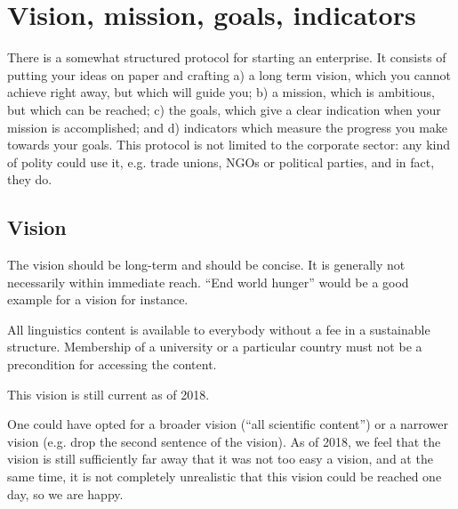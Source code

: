 \documentclass[nonflat,smallfont
]{langsci/langscibook}
\newcommand{\background}[1]{ 
  \vspace{5mm}
  \renewcommand{\tblslinecolour}{lsDarkBlue}
  \tblssy[red]{explore2}{Background}{\vspace*{-5mm}#1}
}
\newcommand{\langscisolution}[1]{
  \renewcommand{\tblslinecolour}{lsLightBlue}
  \tblssy{langsci}{LangSci solution}{\vspace*{-5mm}#1}
}
\newcommand{\evaluation}[1]{
  \renewcommand{\tblslinecolour}{lsLightOrange}
  \tblssy{receipt}{Evaluation}{\vspace*{-5mm}#1}
}
\newcommand{\othersolutions}[1]{
  \renewcommand{\tblslinecolour}{lsDarkGreenOne}
  \tblssy{more}{Other solutions}{\vspace*{-5mm}#1}
}
\renewcommand{\tblssy}[4][black!12]{%
  \renewcommand{\langscisymbol}{#2}\renewcommand{\tblsboxcolor}{#1}
  \begin{mdframed}[style=yellowexercise,frametitle={#3}]
    #4
  \end{mdframed}
}
\begin{document}
\section{Vision, mission, goals, indicators}
There is a somewhat structured protocol for starting an enterprise. It consists of putting your ideas on paper and crafting a) a long term vision, which you cannot achieve right away, but which will guide you;
b) a mission, which is ambitious, but which can be reached; 
c) the goals, which give a clear indication when your mission is accomplished; and
d) indicators which measure the progress you make towards your goals. 
This protocol is not limited to the corporate sector: any kind of polity could use it, e.g. trade unions, NGOs or political parties, and in fact, they do. 

\subsection{Vision}
\vspace*{5mm}\background{The vision should be long-term and should be concise. It is generally not necessarily within immediate reach. ``End world hunger'' would be a good example for a vision for instance.}
\langscisolution{
All linguistics content is available to everybody without a fee in a sustainable structure. Membership of a university or a particular country must not be a precondition for accessing the content.}
\evaluation{This vision is still current as of 2018.}
\othersolutions{One could have opted for a broader vision (``all scientific content'') or a narrower vision (e.g. drop the second sentence of the vision). As of 2018, we feel that the vision is still sufficiently far away that it was not too easy a vision, and at the same time, it is not completely unrealistic that this vision could be reached one day, so we are happy.}
 
\newpage  
\end{document}
